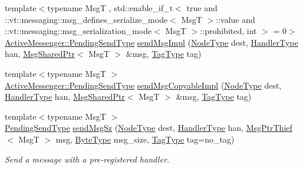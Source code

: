 \begin{DoxyCompactItemize}
\item 
{\footnotesize template$<$typename MsgT , std\+::enable\+\_\+if\+\_\+t$<$ true and \+::vt\+::messaging\+::msg\+\_\+defines\+\_\+serialize\+\_\+mode$<$ Msg\+T $>$\+::value and \+::vt\+::messaging\+::msg\+\_\+serialization\+\_\+mode$<$ Msg\+T $>$\+::prohibited, int $>$  = 0$>$ }\\\hyperlink{structvt_1_1messaging_1_1_active_messenger_a3626a6ca76d8ad4ec7c3b47a2c70d3a8}{Active\+Messenger\+::\+Pending\+Send\+Type} \hyperlink{structvt_1_1messaging_1_1_active_messenger_aae60feeb3e184a5a77d9be6e7c43d91a}{send\+Msg\+Impl} (\hyperlink{namespacevt_a866da9d0efc19c0a1ce79e9e492f47e2}{Node\+Type} dest, \hyperlink{namespacevt_af64846b57dfcaf104da3ef6967917573}{Handler\+Type} han, \hyperlink{structvt_1_1messaging_1_1_msg_shared_ptr}{Msg\+Shared\+Ptr}$<$ MsgT $>$ \&msg, \hyperlink{namespacevt_a84ab281dae04a52a4b243d6bf62d0e52}{Tag\+Type} tag)
\item 
{\footnotesize template$<$typename MsgT $>$ }\\\hyperlink{structvt_1_1messaging_1_1_active_messenger_a3626a6ca76d8ad4ec7c3b47a2c70d3a8}{Active\+Messenger\+::\+Pending\+Send\+Type} \hyperlink{structvt_1_1messaging_1_1_active_messenger_a4234a56f6c50c0c0a0eefd3f3f66b58e}{send\+Msg\+Copyable\+Impl} (\hyperlink{namespacevt_a866da9d0efc19c0a1ce79e9e492f47e2}{Node\+Type} dest, \hyperlink{namespacevt_af64846b57dfcaf104da3ef6967917573}{Handler\+Type} han, \hyperlink{structvt_1_1messaging_1_1_msg_shared_ptr}{Msg\+Shared\+Ptr}$<$ MsgT $>$ \&msg, \hyperlink{namespacevt_a84ab281dae04a52a4b243d6bf62d0e52}{Tag\+Type} tag)
\item 
{\footnotesize template$<$typename MsgT $>$ }\\\hyperlink{structvt_1_1messaging_1_1_active_messenger_a3626a6ca76d8ad4ec7c3b47a2c70d3a8}{Pending\+Send\+Type} \hyperlink{group__preregister_ga0d38199d7351ef980e166d8aaabe1be2}{send\+Msg\+Sz} (\hyperlink{namespacevt_a866da9d0efc19c0a1ce79e9e492f47e2}{Node\+Type} dest, \hyperlink{namespacevt_af64846b57dfcaf104da3ef6967917573}{Handler\+Type} han, \hyperlink{structvt_1_1messaging_1_1_msg_ptr_thief}{Msg\+Ptr\+Thief}$<$ MsgT $>$ msg, \hyperlink{namespacevt_aab8d55968084610ce3b17057981e9300}{Byte\+Type} msg\+\_\+size, \hyperlink{namespacevt_a84ab281dae04a52a4b243d6bf62d0e52}{Tag\+Type} tag=no\+\_\+tag)
\begin{DoxyCompactList}\small\item\em Send a message with a pre-\/registered handler. \end{DoxyCompactList}\item 

\end{DoxyCompactItemize}
